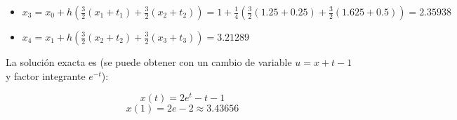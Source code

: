 \documentclass[12pt]{article}
\begin{document}
\begin{ejercicio}[2 puntos]
\begin{enumerate}
        \begin{itemize}
          \item $x_3 = x_0 + h \left( \frac{3}{2} (x_{1} + t_1) + \frac{3}{2} (x_2 + t_2) \right) = 1 + \frac{1}{4} \left( \frac{3}{2} (1.25 + 0.25) + \frac{3}{2} (1.625 + 0.5) \right) = 2.35938$
          \item $x_4 = x_{1} + h \left( \frac{3}{2} (x_{2} + t_2) + \frac{3}{2} (x_{3} + t_3) \right) = 3.21289$
        \end{itemize}
        
        La solución exacta es (se puede obtener con un cambio de variable $u = x+t-1$ y factor integrante $e^{-t}$):

        $$x(t) = 2e^t - t - 1$$
        $$x(1) = 2e - 2 \approx 3.43656$$
      \end{enumerate}
    \end{ejercicio}
\end{document}
